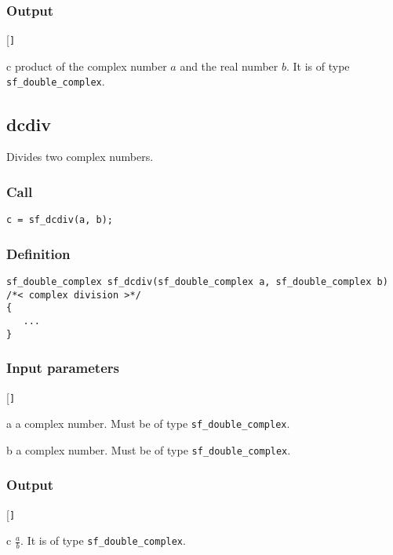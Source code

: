 \subsubsection*{Output}
\begin{desclist}{\tt }{\quad}[\tt ]
   \setlength\itemsep{0pt}
   \item[c] product of the complex number $a$ and the real number $b$. It is of type \texttt{sf\_double\_complex}.
\end{desclist}




\subsection{{dcdiv}}
Divides two complex numbers.

\subsubsection*{Call}
\begin{verbatim}c = sf_dcdiv(a, b);\end{verbatim}

\subsubsection*{Definition}
\begin{verbatim}
sf_double_complex sf_dcdiv(sf_double_complex a, sf_double_complex b)
/*< complex division >*/
{
   ...
}
\end{verbatim}

\subsubsection*{Input parameters}
\begin{desclist}{\tt }{\quad}[\tt ]
   \setlength\itemsep{0pt}
   \item[a] a complex number. Must be of type \texttt{sf\_double\_complex}.  
   \item[b] a complex number. Must be of type \texttt{sf\_double\_complex}.  
\end{desclist}

\subsubsection*{Output}
\begin{desclist}{\tt }{\quad}[\tt ]
   \setlength\itemsep{0pt}
   \item[c] $\frac{a}{b}$. It is of type \texttt{sf\_double\_complex}.
\end{desclist}




